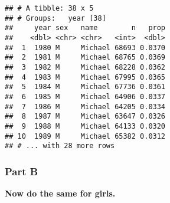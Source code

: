 \documentclass[
]{article}
\newenvironment{Shaded}{\begin{snugshade}}{\end{snugshade}}
\newcommand{\CommentTok}[1]{\textcolor[rgb]{0.56,0.35,0.01}{\textit{#1}}}
\newcommand{\DecValTok}[1]{\textcolor[rgb]{0.00,0.00,0.81}{#1}}
\newcommand{\KeywordTok}[1]{\textcolor[rgb]{0.13,0.29,0.53}{\textbf{#1}}}
\newcommand{\NormalTok}[1]{#1}
\newcommand{\OperatorTok}[1]{\textcolor[rgb]{0.81,0.36,0.00}{\textbf{#1}}}
\newcommand{\StringTok}[1]{\textcolor[rgb]{0.31,0.60,0.02}{#1}}
\begin{document}
\begin{Shaded}
\end{Shaded}

\begin{verbatim}
## # A tibble: 38 x 5
## # Groups:   year [38]
##     year sex   name        n   prop
##    <dbl> <chr> <chr>   <int>  <dbl>
##  1  1980 M     Michael 68693 0.0370
##  2  1981 M     Michael 68765 0.0369
##  3  1982 M     Michael 68228 0.0362
##  4  1983 M     Michael 67995 0.0365
##  5  1984 M     Michael 67736 0.0361
##  6  1985 M     Michael 64906 0.0337
##  7  1986 M     Michael 64205 0.0334
##  8  1987 M     Michael 63647 0.0326
##  9  1988 M     Michael 64133 0.0320
## 10  1989 M     Michael 65382 0.0312
## # ... with 28 more rows
\end{verbatim}

\hypertarget{part-b-1}{%
\subsubsection{Part B}\label{part-b-1}}

\textbf{Now do the same for girls.}

\begin{Shaded}
\end{Shaded}
\end{document}
